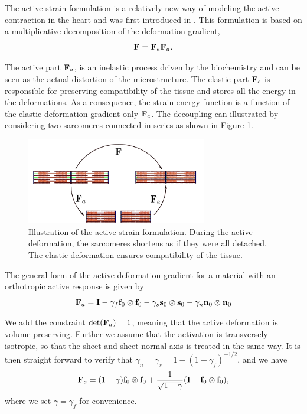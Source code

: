 The active strain formulation is a relatively new way of modeling the
active contraction in the heart and was first introduced in
\cite{taber2000modeling}. This formulation is based on a
multiplicative decomposition of the deformation gradient, 
\begin{equation}
 \mathbf{F} = \mathbf{F}_e \mathbf{F}_a.
\label{eq:active_strain}
\end{equation}


The active part $\mathbf{F}_a$, is an inelastic process driven by the
biochemistry and can be seen as the actual distortion of the
microstructure. The elastic part $\mathbf{F}_e$ is responsible for preserving
compatibility of the tissue and stores all the energy in the
deformations. As a consequence, the strain energy function is a
function of the elastic deformation gradient only $\mathbf{F}_e$. The
decoupling can illustrated by considering two sarcomeres connected in
series as shown in Figure \ref{fig:actstrain}. 

\begin{figure}[htbp]
  \centering
    \includegraphics[width=0.7\textwidth]{chapters/introduction/figures/actstrain.pdf}
\caption{Illustration of the active strain formulation. During the active
deformation, the sarcomeres shortens as if they were all detached. The
elastic deformation ensures compatibility of the tissue.}
\label{fig:actstrain}
\end{figure}


The general form of the active deformation gradient for a
material with an orthotropic active response is given by
\begin{equation}
  \mathbf{F}_a =  \mathbf{I}
  - \gamma_f \mathbf{f}_0 \otimes \mathbf{f}_0
  - \gamma_s \mathbf{s}_0 \otimes \mathbf{s}_0
  - \gamma_n \mathbf{n}_0\otimes \mathbf{n}_0
 \label{eq:active_strain_Fa_general}
\end{equation}

We add the constraint $\det(\mathbf{F}_a) = 1$, meaning that the active
deformation is volume preserving. Further we assume that the activation is
transversely isotropic, so that the sheet and sheet-normal axis is
treated in the same way. It is then straight forward to verify that
$\gamma_n = \gamma_s =1- (1-\gamma_f)^{-1/2}$, and we have
\begin{equation}
  \mathbf{F}_a = (1 - \gamma) \mathbf{f}_0 \otimes \mathbf{f}_0  + \frac{1}{\sqrt{1 - \gamma}} (\mathbf{I} - \mathbf{f}_0 \otimes \mathbf{f}_0), 
 \label{eq:intro_active_strain_Fa_gjerald}
\end{equation}
where we set $\gamma = \gamma_f$ for convenience. 


